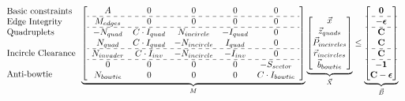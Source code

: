 \documentclass[11pt]{article}
\begin{document}
\begin{equation}\label{eq:milp}
\begin{array}{l}
    \text{Basic constraints} \\
    \text{Edge Integrity} \\
    \text{Quadruplets} \\
    \\
    \text{Incircle Clearance} \\
    \\
    \text{Anti-bowtie}
    \\
\end{array}
\underbrace{
\left[
\begin{array}{ccccc}
    A & 0 & 0 & 0 & 0 \\
    \hdashline
    M_{edges} & 0 & 0 & 0 & 0 \\
    \hdashline
    -N_{quad} & C \cdot I_{quad} & N_{incircle} & -I_{quad} & 0 \\
    N_{quad} & C \cdot I_{quad} & -N_{incircle} & I_{quad} & 0 \\
    \hdashline
    N_{invader} & C \cdot I_{inv} & -N_{incircle} & -I_{inv} & 0 \\
    \hdashline
    0 & 0 & 0 & 0 & -S_{sector} \\
    N_{bowtie} & 0 & 0 & 0 & C \cdot I_{bowtie} 
\end{array}
\right]}_{M}
\underbrace{
\begin{bmatrix}
    \vec{x} \\
    \vec{z}_{quads} \\
    \vec{P}_{incircles} \\
    \vec{r}_{incircles} \\
    \vec{b}_{bowtie}
\end{bmatrix}}_{\vec{X}}
\le
\underbrace{
\begin{bmatrix}
    \mathbf{0} \\
    \hdashline
    -\boldsymbol{\epsilon} \\
    \hdashline
    \mathbf{C} \\
    \mathbf{C} \\
    \hdashline
    \mathbf{C} \\
    \hdashline
    -\mathbf{1} \\
    \mathbf{C} - \boldsymbol{\epsilon}
\end{bmatrix}}_{\vec{B}}
\end{equation}
\end{document}
